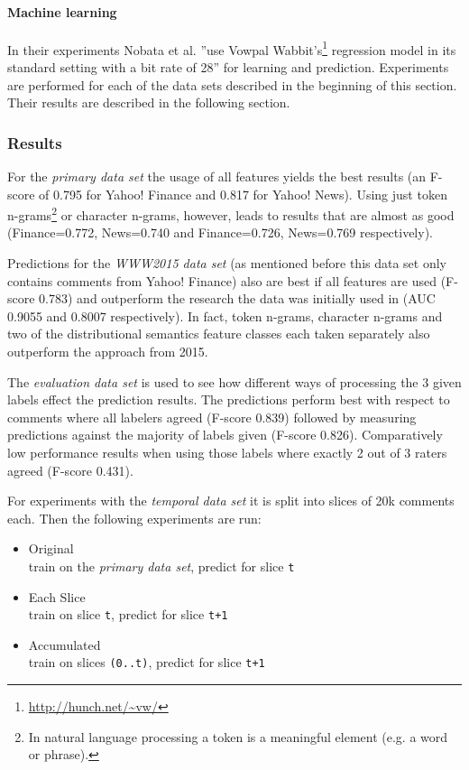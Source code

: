 \documentclass{proseminar}
\begin{document}

\paragraph{Machine learning} In their experiments Nobata et al. ''use Vowpal Wabbit's\footnote{\url{http://hunch.net/~vw/}} regression model in its standard setting with a bit rate of 28''\cite{Yahoo:2016} for learning and prediction. Experiments are performed for each of the data sets described in the beginning of this section. Their results are described in the following section.

\subsubsection{Results}
For the \emph{primary data set} the usage of all features yields the best results (an F-score of 0.795 for Yahoo! Finance and 0.817 for Yahoo! News). Using just token n-grams\footnote{In natural language processing a token is a meaningful element (e.g. a word or phrase).} or character n-grams, however, leads to results that are almost as good (Finance=0.772, News=0.740 and Finance=0.726, News=0.769 respectively).

Predictions for the \emph{WWW2015 data set} (as mentioned before this data set only contains comments from Yahoo! Finance) also are best if all features are used (F-score 0.783) and outperform the research the data was initially used in\cite{Yahoo:2015} (AUC 0.9055 and 0.8007 respectively). In fact, token n-grams, character n-grams and two of the distributional semantics feature classes each taken separately also outperform the approach from 2015.

The \emph{evaluation data set} is used to see how different ways of processing the 3 given labels effect the prediction results. The predictions perform best with respect to comments where all labelers agreed (F-score 0.839) followed by measuring predictions against the majority of labels given (F-score 0.826). Comparatively low performance results when using those labels where exactly 2 out of 3 raters agreed (F-score 0.431).

For experiments with the \emph{temporal data set} it is split into slices of 20k comments each. Then the following experiments are run:
\begin{itemize}
\item \lbrack Original\rbrack\\train on the \emph{primary data set}, predict for slice \texttt{t}
\item \lbrack Each Slice\rbrack\\train on slice \texttt{t}, predict for slice \texttt{t+1}
\item \lbrack Accumulated\rbrack\\train on slices \texttt{(0..t)}, predict for slice \texttt{t+1}
\end{itemize}
\end{document}

